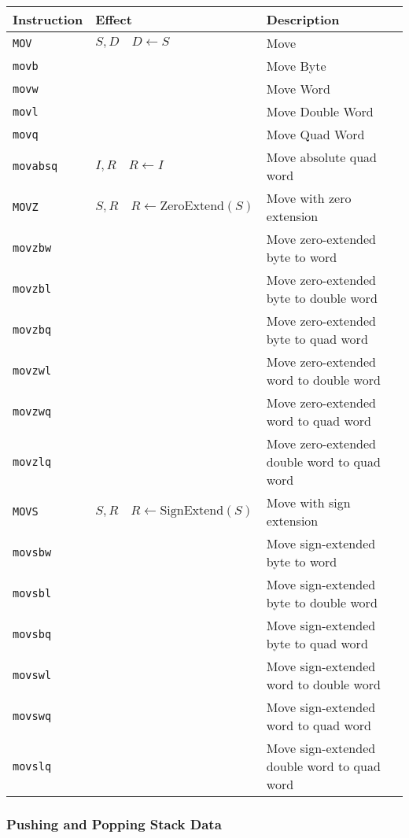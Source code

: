 \documentclass[10pt]{armath}
\newcommand{\s}[1]{\texttt{#1}}
\begin{document}
\begin{center}
  \begin{tabular}{l l l}
    \hline
    Instruction & Effect & Description\\
    \hline
    \hline
    \s{MOV} & $S, D\quad D\leftarrow S$ & Move\\
    \s{movb} & & Move Byte\\
    \s{movw} & & Move Word\\
    \s{movl} & & Move Double Word\\
    \s{movq} & & Move Quad Word\\
    \hline
    \s{movabsq} & $I,R\quad R\leftarrow I$ & Move absolute quad word\\
    \hline
    \s{MOVZ} & $S,R\quad R\leftarrow\text{ZeroExtend}(S)$ & Move with zero
    extension\\
    \s{movzbw} & & Move zero-extended byte to word\\
    \s{movzbl} & & Move zero-extended byte to double word\\
    \s{movzbq} & & Move zero-extended byte to quad word\\
    \s{movzwl} & & Move zero-extended word to double word\\
    \s{movzwq} & & Move zero-extended word to quad word\\
    \s{movzlq} & & Move zero-extended double word to quad word\\
    \hline
    \s{MOVS} & $S,R\quad R\leftarrow\text{SignExtend}(S)$ & Move with sign
    extension\\
    \s{movsbw} & & Move sign-extended byte to word\\
    \s{movsbl} & & Move sign-extended byte to double word\\
    \s{movsbq} & & Move sign-extended byte to quad word\\
    \s{movswl} & & Move sign-extended word to double word\\
    \s{movswq} & & Move sign-extended word to quad word\\
    \s{movslq} & & Move sign-extended double word to quad word\\
    \hline
  \end{tabular}
\end{center}

\subsubsection{Pushing and Popping Stack Data}%
\label{ssub:pushing_and_popping_stack_data}
\end{document}

